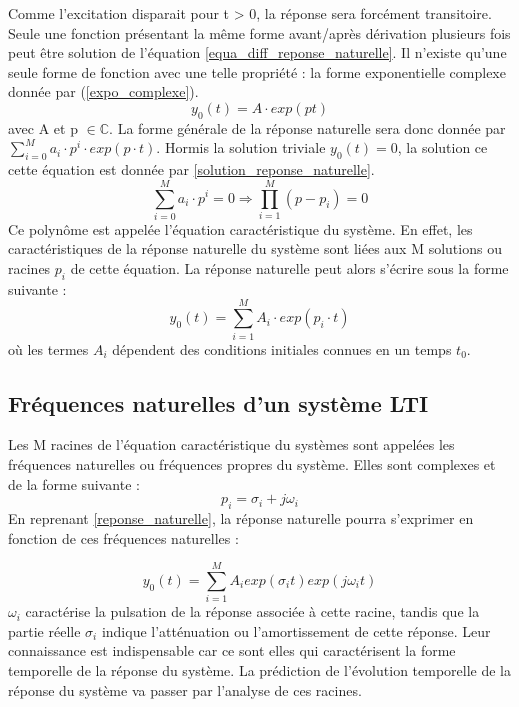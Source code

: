 	Comme l'excitation disparait pour t > 0, la réponse sera forcément transitoire. Seule une fonction présentant la même forme avant/après dérivation plusieurs fois peut être solution de l'équation \ref{equa_diff_reponse_naturelle}. Il n'existe qu'une seule forme de fonction avec une telle propriété : la forme exponentielle complexe donnée par (\ref{expo_complexe}).
	\begin{equation}\label{expo_complexe}
	y_{0}(t) = A \cdot exp(p t)       
	\end{equation}
	avec A et p $\in \mathbb{C}$. La forme générale de la réponse naturelle sera donc donnée par $ \sum_{i=0}^M a_{i}\cdot p^{i} \cdot exp(p \cdot t) $. Hormis la solution triviale $y_{0}(t) = 0$, la solution ce cette équation est donnée par \ref{solution_reponse_naturelle}.
	\begin{equation} \label{solution_reponse_naturelle}
	\sum_{i=0}^M a_{i}\cdot p^{i} = 0 \Rightarrow \prod_{i=1}^{M} (p-p_{i}) = 0     
	\end{equation}	
	Ce polynôme est appelée l'équation caractéristique du système. En effet, les caractéristiques de la réponse naturelle du système sont liées aux M solutions ou racines $p_{i}$ de cette équation. La réponse naturelle peut alors s'écrire sous la forme suivante :
	\begin{equation}\label{reponse_naturelle}
	y_{0}(t) = \sum_{i=1}^M A_{i}\cdot exp(p_{i} \cdot t) 
	\end{equation}
	où les termes $A_{i}$ dépendent des conditions initiales connues en un temps $ t_{0}$.
	
	\vspace{1\baselineskip}
	
	\subsection{Fréquences naturelles d'un système LTI}
	Les M racines de l'équation caractéristique du systèmes sont appelées les fréquences naturelles ou fréquences propres du système. Elles sont complexes et de la forme suivante :
	\begin{equation}\label{freq_propre}
	p_{i} = \sigma_{i} + j\omega_{i} 
	\end{equation}	
	En reprenant \ref{reponse_naturelle}, la réponse naturelle pourra s'exprimer en fonction de ces fréquences naturelles :
		
	\begin{equation}\label{Reponse_Naturelle}
	y_{0}(t) = \sum_{i=1}^M A_{i}exp(\sigma_{i}  t) exp(j\omega_{i} t)
	\end{equation}
	$\omega_{i}$ caractérise la pulsation de la réponse associée à cette racine, tandis que la partie réelle $\sigma_{i}$ indique l'atténuation ou l'amortissement de cette réponse. Leur connaissance est indispensable car ce sont elles qui caractérisent la forme temporelle de la réponse du système. La prédiction de l'évolution temporelle de la réponse du système va passer par l'analyse de ces racines. 
	
